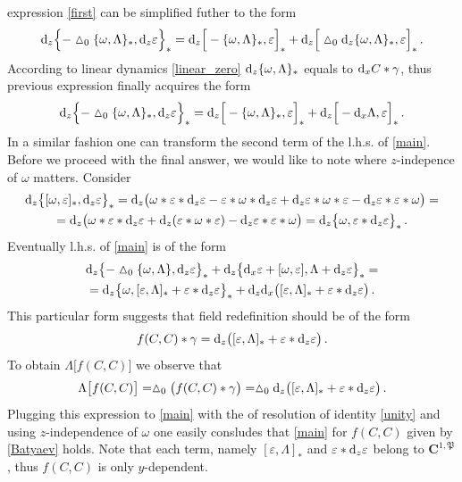 \documentclass[12pt]{article}
\newcommand{\dr}{{{\rm d}}}
\newcommand{\go}{\omega}
\newcommand{\hmt}{\vartriangle}
\begin{document}
expression \eqref{first} can be simplified futher to the form
\begin{equation}
\dr_z\Big\{-\hmt_0\{\go,\Lambda\}_\ast,\dr_z \varepsilon\Big\}_\ast=\dr_z\Big[-\{\go,\Lambda\}_\ast,\varepsilon\Big]_\ast+\dr_z\Big[\hmt_0\dr_z\{\go,\Lambda\}_\ast,\varepsilon\Big]_\ast\,.
\end{equation}
According to linear dynamics \eqref{linear_zero} $\dr_z\{\go,\Lambda\}_\ast$ equals to $\dr_x C\ast \gamma$, thus previous expression finally acquires the form
\begin{equation}
\dr_z\Big\{-\hmt_0\{\go,\Lambda\}_\ast,\dr_z \varepsilon\Big\}_\ast=\dr_z\Big[-\{\go,\Lambda\}_\ast,\varepsilon\Big]_\ast+\dr_z\Big[-\dr_x\Lambda,\varepsilon\Big]_\ast\,.
\end{equation}
In a similar fashion one can transform the second term of the l.h.s. of \eqref{main}. Before we proceed with the final answer, we would like to note where $z$-indepence of $\omega$ matters. Consider 
\begin{multline}
\dr_z\big\{[\go,\varepsilon]_\ast,\dr_z\varepsilon\big\}_\ast=\dr_z\big(\go\ast \varepsilon\ast \dr_z\varepsilon-\varepsilon\ast\go\ast \dr_z \varepsilon+\dr_z \varepsilon\ast \go\ast\varepsilon-\dr_z\varepsilon \ast \varepsilon\ast\go\big)=\\
=\dr_z\big(\go\ast \varepsilon\ast \dr_z\varepsilon+\dr_z (\varepsilon\ast \go\ast\varepsilon)-\dr_z\varepsilon \ast \varepsilon\ast\go\big)=\dr_z\big\{\go,\varepsilon\ast \dr_z\varepsilon\big\}_\ast\,.
\end{multline}
Eventually l.h.s. of \eqref{main} is of the form
\begin{multline}
\dr_z\big\{-\hmt_0\{\go,\Lambda\},\dr_z \varepsilon\big\}_\ast+\dr_z\big\{\dr_x \varepsilon+[\go,\varepsilon],\Lambda+\dr_z \varepsilon\big\}_\ast=\\
=\dr_z\big\{\go,[\varepsilon,\Lambda]_\ast+\varepsilon\ast \dr_z\varepsilon\big\}_\ast+\dr_z\dr_x\big([\varepsilon,\Lambda]_\ast+\varepsilon\ast \dr_z\varepsilon\big)\,.
\end{multline}
This particular form suggests that field redefinition should be of the form
\begin{equation}\label{Batyaev}
f(C,C)\ast \gamma=\dr_z\big([\varepsilon,\Lambda]_\ast+\varepsilon\ast \dr_z\varepsilon\big)\,.
\end{equation}
To obtain $\Lambda\big[f(C,C)\big]$ we observe that
\begin{equation}
\Lambda\big[f(C,C)\big]=\hmt_0\big(f(C,C)\ast\gamma\big)=\hmt_0\dr_z \big([\varepsilon,\Lambda]_\ast+\varepsilon\ast \dr_z\varepsilon\big)\,.
\end{equation}
Plugging this expression to \eqref{main} with the of resolution of identity \eqref{unity} and using $z$-independence of $\omega$ one easily consludes that \eqref{main} for $f(C,C)$ given by \eqref{Batyaev} holds. Note that each term, namely $[\varepsilon,\Lambda]_\ast$ and $\varepsilon\ast \dr_z\varepsilon$ belong to $\mathbf{C}^{1,\mathfrak{P}}$, thus $f(C,C)$ is only $y$-dependent.
\end{document}
